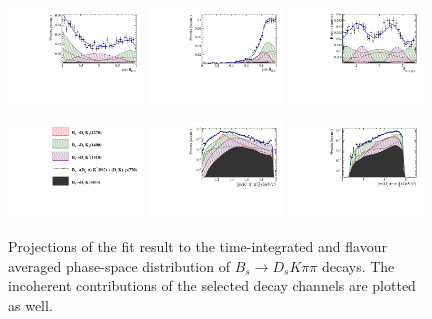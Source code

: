 \begin{figure}[h]
		\includegraphics[width=0.32\textwidth, height = !]{figs/lassoFit/LASSO/h_cosTheta_Kpi_mod.pdf} 
		\includegraphics[width=0.32\textwidth, height = !]{figs/lassoFit/LASSO/h_cosTheta_Dspi_mod.pdf} 
		\includegraphics[width=0.32\textwidth, height = !]{figs/lassoFit/LASSO/h_phi_Kpi_Dspi_mod.pdf} 

		\caption{\small Projections of the fit result to the time-integrated and flavour averaged phase-space distribution of $B_s \to D_s K \pi \pi$  decays.
		The incoherent contributions of the selected decay channels are plotted as well.   } 		
				\label{fig:lassoFit}

	\centering
		\includegraphics[width=0.32\textwidth, height = !]{figs/lassoFit/LASSO/leg.pdf} 
		\includegraphics[width=0.32\textwidth, height = !]{figs/lassoFit/LASSO/m_Kpipi_mod_log.pdf} 
		\includegraphics[width=0.32\textwidth, height = !]{figs/lassoFit/LASSO/m_Dspipi_mod_log.pdf} 


\end{figure}
